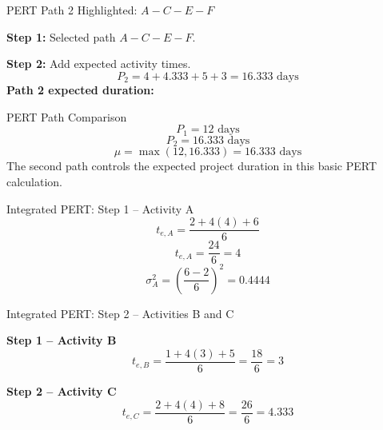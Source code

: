 \documentclass[aspectratio=169,10pt]{beamer}
\begin{document}
\begin{frame}{PERT Path 2 Highlighted: $A-C-E-F$}
\centering
{}
\vspace{0.05cm}
\par\textbf{Step 1:} Selected path $A-C-E-F$.
\pause
\par\textbf{Step 2:} Add expected activity times.
\[
P_2=4+4.333+5+3=16.333\text{ days}
\]
\pause
\textbf{Path 2 expected duration: }
\end{frame}

\begin{frame}{PERT Path Comparison}
\[P_1=12\text{ days}\]
\pause
\[P_2=16.333\text{ days}\]
\pause
\[\mu=\max(12,16.333)=\boxed{16.333\text{ days}}\]
\pause
The second path controls the expected project duration in this basic PERT calculation.
\end{frame}

\begin{frame}{Integrated PERT: Step 1 -- Activity A}
\[t_{e,A}=\frac{2+4(4)+6}{6}\]
\pause
\[t_{e,A}=\frac{24}{6}=\boxed{4}\]
\pause
\[\sigma_A^2=\left(\frac{6-2}{6}\right)^2=\boxed{0.4444}\]
\end{frame}

\begin{frame}{Integrated PERT: Step 2 -- Activities B and C}
\small
\par\textbf{Step 1 -- Activity B}
\[
t_{e,B}=\frac{1+4(3)+5}{6}=\frac{18}{6}=\boxed{3}
\]
\pause
\par\textbf{Step 2 -- Activity C}
\[
t_{e,C}=\frac{2+4(4)+8}{6}=\frac{26}{6}=\boxed{4.333}
\]
\end{frame}
\end{document}
